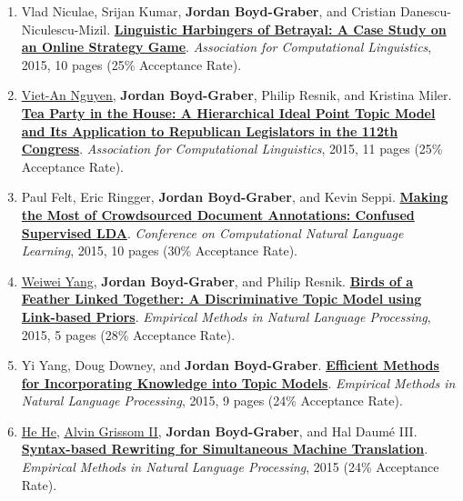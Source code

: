 {\begin{enumerate}
	 \item Vlad Niculae, Srijan Kumar, {\bf Jordan Boyd-Graber}, and Cristian Danescu-Niculescu-Mizil.  {\bf \href{http://cs.umd.edu/~jbg//docs/2015_acl_diplomacy.pdf}{Linguistic Harbingers of Betrayal: A Case Study on an Online Strategy Game}}.  \emph{Association for Computational Linguistics}, 2015, 10 pages (25\% Acceptance Rate).

	 \item \underline{\href{https://viet-an.github.io/}{Viet-An Nguyen}}, {\bf Jordan Boyd-Graber}, Philip Resnik, and Kristina Miler.  {\bf \href{http://cs.umd.edu/~jbg//docs/2015_acl_teaparty.pdf}{Tea Party in the House: A Hierarchical Ideal Point Topic Model and Its Application to Republican Legislators in the 112th Congress}}.  \emph{Association for Computational Linguistics}, 2015, 11 pages (25\% Acceptance Rate).

	 \item Paul Felt, Eric Ringger, {\bf Jordan Boyd-Graber}, and Kevin Seppi.  {\bf \href{http://cs.umd.edu/~jbg//docs/2015_conll_cslda.pdf}{Making the Most of Crowdsourced Document Annotations: Confused Supervised {LDA}}}.  \emph{Conference on Computational Natural Language Learning}, 2015, 10 pages (30\% Acceptance Rate).

	 \item \underline{\href{https://ywwbill.github.io/}{Weiwei Yang}}, {\bf Jordan Boyd-Graber}, and Philip Resnik.  {\bf \href{http://cs.umd.edu/~jbg//docs/2015_emnlp_hinge_link.pdf}{Birds of a Feather Linked Together: A Discriminative Topic Model using Link-based Priors}}.  \emph{Empirical Methods in Natural Language Processing}, 2015, 5 pages (28\% Acceptance Rate).

	 \item Yi Yang, Doug Downey, and {\bf Jordan Boyd-Graber}.  {\bf \href{http://cs.umd.edu/~jbg//docs/2015_emnlp_fast_priors.pdf}{Efficient Methods for Incorporating Knowledge into Topic Models}}.  \emph{Empirical Methods in Natural Language Processing}, 2015, 9 pages (24\% Acceptance Rate).

	 \item \underline{\href{https://hhexiy.github.io/}{He He}}, \underline{\href{https://agrissom.sites.haverford.edu/}{Alvin Grissom II}}, {\bf Jordan Boyd-Graber}, and Hal {Daum\'{e} III}.  {\bf \href{http://cs.umd.edu/~jbg//docs/2015_emnlp_rewrite.pdf}{Syntax-based Rewriting for Simultaneous Machine Translation}}.  \emph{Empirical Methods in Natural Language Processing}, 2015 (24\% Acceptance Rate).


\end{enumerate}}

